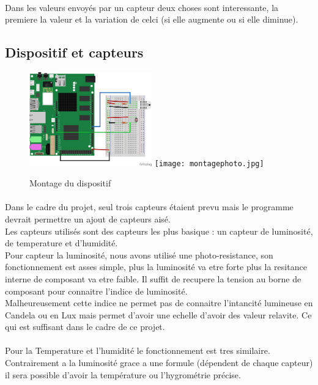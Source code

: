 \documentclass[a4paper, titlepage, oneside, 12pt]{article}%
\begin{document}
\paragraph{}
Dans les valeurs envoyés par un capteur deux choses sont interessante, la premiere la valeur et la variation de celci (si elle augmente ou si elle diminue).
\subsection{Dispositif et capteurs}
\begin{figure}
	\centering
	\includegraphics[width=200px]{montage.jpg}
		\texttt{[image: montagephoto.jpg]}
	\caption{Montage du dispositif}
\end{figure}
\paragraph{}
Dans le cadre du projet, seul trois capteurs étaient prevu mais le programme devrait permettre un ajout de capteurs  aisé.\\
Les capteurs utilisés sont des capteurs les plus basique : un capteur de luminosité, de temperature et d'humidité.\\

Pour capteur la luminosité, nous avons utilisé une photo-resistance, son fonctionnement est asses simple, plus la luminosité va etre forte plus la resitance interne de composant va etre faible. Il suffit de recupere la tension au borne de composant pour connaitre l'indice de luminosité.\\ 
Malheureusement cette indice ne permet pas de connaitre l'intancité lumineuse en Candela ou en Lux mais permet d'avoir une echelle d'avoir des valeur relavite. Ce qui est suffisant dans le cadre de ce projet.
\paragraph{}
Pour la Temperature et l'humidité le fonctionnement est tres similaire. Contrairement a la luminosité grace a une formule (dépendent de chaque capteur) il sera possible d'avoir la température ou l'hygrométrie précise. 
\end{document}
